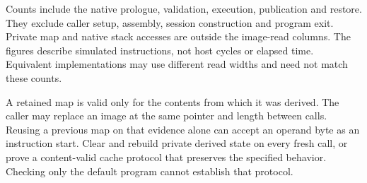 Counts include the native prologue, validation, execution, publication and restore.
They exclude caller setup, assembly, session construction and program exit. Private
map and native stack accesses are outside the image-read columns. The figures describe
simulated instructions, not host cycles or elapsed time. Equivalent implementations
may use different read widths and need not match these counts.

A retained map is valid only for the contents from which it was derived. The caller
may replace an image at the same pointer and length between calls. Reusing a previous
map on that evidence alone can accept an operand byte as an instruction start. Clear
and rebuild private derived state on every fresh call, or prove a content-valid cache
protocol that preserves the specified behavior. Checking only the default program
cannot establish that protocol.
